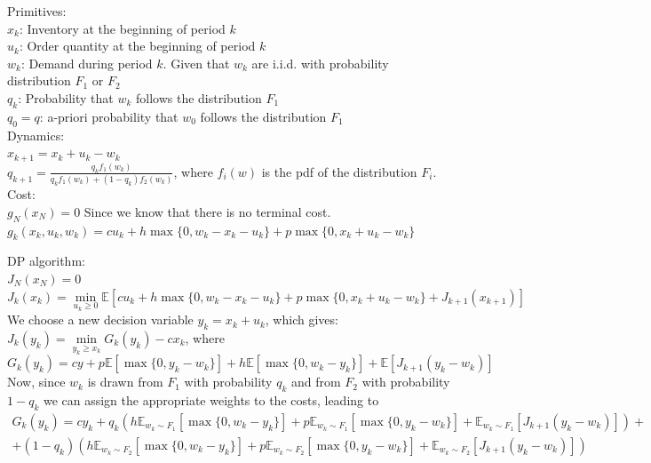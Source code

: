 \documentclass[11pt, oneside]{article}   	%
\begin{document}
Primitives:\\

$x_k$: Inventory at the beginning of period $k$\\
$u_k$: Order quantity at the beginning of period $k$\\
$w_k$: Demand during period $k$. Given that $w_k$ are i.i.d. with probability distribution $F_1$ or $F_2$\\
$q_k$: Probability that $w_k$ follows the distribution $F_1$\\
$q_0=q$: a-priori probability that $w_0$ follows the distribution $F_1$\\

Dynamics:\\

$x_{k+1} = x_k + u_k - w_k$\\
$q_{k+1}=\frac{q_kf_1(w_k)}{q_kf_1(w_k)+(1-q_k)f_2(w_k)}$, where $f_i(w)$ is the pdf of the distribution $F_i$.\\

Cost:\\

$g_N(x_N)=0$ \qquad \qquad Since we know that there is no terminal cost.\\
$g_k(x_k, u_k, w_k) = cu_k + h \max{\{0,w_k - x_k - u_k\}} + p \max{\{0, x_k + u_k - w_k\}}$

DP algorithm:\\

$J_N(x_N)=0$\\
$J_k(x_k)=\underset{u_k\geq 0}{\min}\mathbb{E}\left[cu_k+h\max\{0,w_k-x_k-u_k\}+p\max\{0,x_k+u_k-w_k\}+J_{k+1}(x_{k+1})\right]$\\

We choose a new decision variable $y_k=x_k+u_k$, which gives: \\
$J_k(y_k)=\underset{y_k\geq x_k}{\min}G_k(y_k)-cx_k$, where $$G_k(y_k)=cy+p\mathbb{E}[\max\{0,y_k-w_k\}]+h\mathbb{E}[\max\{0,w_k-y_k\}]+\mathbb{E}[J_{k+1}(y_k-w_k)]$$
Now, since $w_k$ is drawn from $F_1$ with probability $q_k$ and from $F_2$ with probability $1-q_k$ we can assign the appropriate weights to the costs, leading to\\
\begin{align*}
G_k(y_k)=cy_k+q_k(h\mathbb{E}_{w_k \sim F_1}[\max\{0,w_k-y_k\}]+p\mathbb{E}_{w_k \sim F_1}[\max\{0,y_k-w_k\}]+\mathbb{E}_{w_k \sim F_1}[J_{k+1}(y_k-w_k)])+\\
+(1-q_k)(h\mathbb{E}_{w_k \sim F_2}[\max\{0,w_k-y_k\}]+p\mathbb{E}_{w_k \sim F_2}[\max\{0,y_k-w_k\}]+\mathbb{E}_{w_k \sim F_2}[J_{k+1}(y_k-w_k)])
\end{align*}\\
\end{document}
